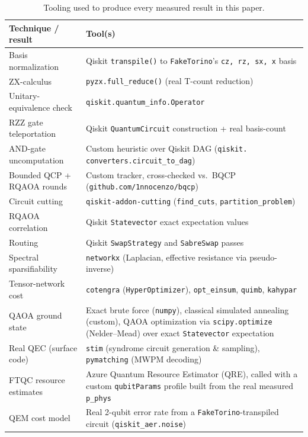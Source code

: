 \documentclass[9pt,twocolumn]{extarticle}
\begin{document}
\begin{table}[t]
\centering\footnotesize
\caption{Tooling used to produce every measured result in this paper.}
\label{tab:tools}
\begin{tabular}{@{}p{2.1cm}p{5.6cm}@{}}
\toprule
Technique / result & Tool(s) \\
\midrule
Basis normalization & Qiskit \texttt{transpile()} to \texttt{FakeTorino}'s
\texttt{cz, rz, sx, x} basis \\
ZX-calculus & \texttt{pyzx.full\_reduce()} (real T-count reduction) \\
Unitary-equivalence check & \texttt{qiskit.quantum\_info.Operator} \\
RZZ gate teleportation & Qiskit \texttt{QuantumCircuit} construction + real
basis-count \\
AND-gate uncomputation & Custom heuristic over Qiskit DAG (\texttt{qiskit.
converters.circuit\_to\_dag}) \\
Bounded QCP + RQAOA rounds & Custom tracker, cross-checked vs.\ BQCP
(\texttt{github.com/1nnocenzo/bqcp}) \\
Circuit cutting & \texttt{qiskit-addon-cutting} (\texttt{find\_cuts},
\texttt{partition\_problem}) \\
RQAOA correlation & Qiskit \texttt{Statevector} exact expectation values \\
Routing & Qiskit \texttt{SwapStrategy} and \texttt{SabreSwap} passes \\
Spectral sparsifiability & \texttt{networkx} (Laplacian, effective
resistance via pseudo-inverse) \\
Tensor-network cost & \texttt{cotengra} (\texttt{HyperOptimizer}),
\texttt{opt\_einsum}, \texttt{quimb}, \texttt{kahypar} \\
QAOA ground state & Exact brute force (\texttt{numpy}), classical simulated
annealing (custom), QAOA optimization via \texttt{scipy.optimize} (Nelder--Mead)
over exact \texttt{Statevector} expectation \\
Real QEC (surface code) & \texttt{stim} (syndrome circuit generation \&
sampling), \texttt{pymatching} (MWPM decoding) \\
FTQC resource estimates & Azure Quantum Resource Estimator (QRE), called
with a custom \texttt{qubitParams} profile built from the real measured
\texttt{p\_phys} \\
QEM cost model & Real 2-qubit error rate from a \texttt{FakeTorino}-transpiled
circuit (\texttt{qiskit\_aer.noise}) \\
\bottomrule
\end{tabular}
\end{table}
\end{document}

